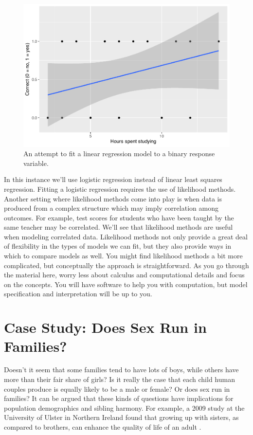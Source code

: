 \documentclass[
]{krantz}
\begin{document}
\begin{figure}

{\centering \includegraphics[width=0.9\linewidth]{bookdown-BeyondMLR_files/figure-latex/logistic1-1} 

}

\caption{An attempt to fit a linear regression model to a binary response variable.}\label{fig:logistic1}
\end{figure}

In this instance we'll use logistic regression instead of linear least squares regression. Fitting a logistic regression requires the use of likelihood methods. Another setting where likelihood methods come into play is when data is produced from a complex structure which may imply correlation among outcomes. For example, test scores for students who have been taught by the same teacher may be correlated. We'll see that likelihood methods are useful when modeling correlated data. Likelihood methods not only provide a great deal of flexibility in the types of models we can fit, but they also provide ways in which to compare models as well. You might find likelihood methods a bit more complicated, but conceptually the approach is straightforward. As you go through the material here, worry less about calculus and computational details and focus on the concepts. You will have software to help you with computation, but model specification and interpretation will be up to you.

\section{Case Study: Does Sex Run in Families?}\label{case-study-does-sex-run-in-families}

Doesn't it seem that some families tend to have lots of boys, while others have more than their fair share of girls? Is it really the case that each child human couples produce is equally likely to be a male or female? Or does sex run in families? It can be argued that these kinds of questions have implications for population demographics and sibling harmony. For example, a 2009 study at the University of Ulster in Northern Ireland found that growing up with sisters, as compared to brothers, can enhance the quality of life of an adult \citep{BBCNEWS1995}.
\end{document}
